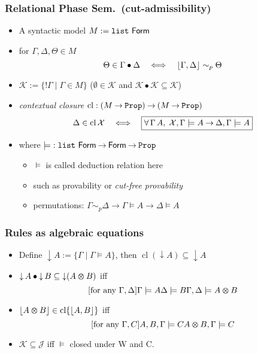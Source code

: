 \documentclass[xcolor=pdftex,graphicx=pdftex,12pt]{beamer}
\renewcommand\frule[1]{\ensuremath{\langle#1\rangle}}
\newcommand{\coq}[1]{\ensuremath{\mathalpha{\mathtt{#1}}}}
\newcommand{\cfun}{\mathbin{\rightarrow}}
\newcommand{\Prop}{\coq{Prop}}
\newcommand{\cdef}{\mathrel{\mathtt{:=}}}
\renewcommand{\iff}{\mathrel\Longleftrightarrow}
\newcommand{\ltime}{\mathbin{\varotimes}}
\newcommand{\lbang}{\mathop{!}}
\newcommand{\cperm}{\mathrel{\sim_p}}
\newcommand{\cl}{\mathop{\mathrm{cl}}}
\newcommand{\mmult}{\mathbin{\bullet}}
\newcommand{\set}[1]{\mathcal{#1}}
\newcommand{\pable}{\mathrel{\models}}
\begin{document}
\begin{frame}

\frametitle{Relational Phase Sem.\ (cut-admissibility)}


\begin{itemize}
\item A syntactic model  $M\cdef \coq{list}~\mathsf{Form}$
\item for $\Gamma,\Delta,\Theta\in M$
$$\Theta\in \Gamma\mmult \Delta \quad\iff\quad\ulist{\Gamma,\Delta}\cperm\Theta$$
\item $\set K\cdef \{\lbang\Gamma\mid\Gamma\in M\}$ ($\emptyset\in\set K$ and $\set K\mmult\set K\subseteq\set K$)
\item \emph{contextual closure}  $\cl: (M\cfun\Prop)\cfun (M\cfun\Prop)$ 
$$\Delta\in\cl\set X\quad\iff\quad \fbox{$\forall\,\Gamma\,A,\;\set X,\Gamma\pable A\cfun \Delta,\Gamma\pable A$}$$ 
\item where ${\pable}:\coq{list}~\mathsf{Form}\cfun\mathsf{Form}\cfun\Prop$
  \begin{itemize}
  \item $\pable$ is called deduction relation here
  \item such as provability or \emph{cut-free provability}
  \item permutations: $\Gamma\cperm\Delta\cfun \Gamma\pable A\cfun \Delta\pable A$
  \end{itemize}
\end{itemize}

\end{frame}

\newcommand{\dc}{\mathop{\downarrow}}
\renewcommand\frule[1]{#1}


\begin{frame}

\frametitle{Rules as algebraic equations}

\begin{itemize}

\item Define $\dc A\cdef \{\Gamma\mid \Gamma\pable A\}$, then $\cl(\dc A)\subseteq \dc A$ 
\item $\dc A\mmult\dc B\subseteq \dc(A\ltime B)$ iff 
$$
\infer2[\text{for any $\Gamma,\Delta$}]   {\Gamma \pable A}{\Delta \pable B}
                      {\Gamma, \Delta \pable A \ltime B}$$
\item $\ulist{A\ltime B}\in\cl\{\ulist{A,B}\}$ iff
$$
\infer1[\text{for any $\Gamma,C$}]   {A,B,\Gamma \pable C} 
                      { A \ltime B, \Gamma\pable C}$$
\item $\set K\subseteq\set J$ iff $\pable$ closed under \frule W and \frule C.
\end{itemize}

\end{frame}
\end{document}
